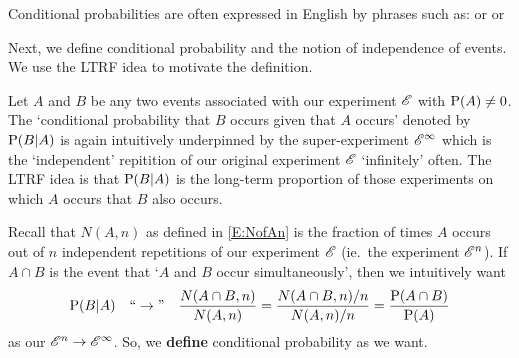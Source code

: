 Conditional probabilities are  often
expressed in English by phrases such as: or  or 

Next, we define conditional probability and the notion of independence of events.  We use the LTRF idea to motivate the definition.
\begin{idea}
Let $A$ and $B$ be any two events associated with our experiment $\EE{E}$ with $\P(A) \neq 0$.  The `conditional probability that $B$ occurs given that $A$ occurs' denoted by $\P(B|A)$ is again intuitively underpinned by the super-experiment $\EE{E}^{\infty}$ which is the `independent' repitition of our original experiment $\EE{E}$ `infinitely' often.  The LTRF idea is that $\P(B|A)$ is the long-term proportion of those experiments on which $A$ occurs that $B$ also occurs.
 
Recall that $N(A,n)$ as defined in \eqref{E:NofAn} is the fraction of times $A$ occurs out of $n$ independent repetitions of our experiment $\EE{E}$ (ie.~the experiment $\EE{E}^{n}$).  If $A \cap B$ is the event that `$A$ and $B$ occur simultaneously', then we intuitively want
\[
\P(B|A) \quad \lq\lq \rightarrow " \quad \frac{N(A \cap B,n)}{N(A,n)} = \frac{N(A \cap B,n)/n}{N(A,n)/n} =  \frac{\P(A \cap B)}{\P(A)}
\]
as our $\EE{E}^{n} \rightarrow \EE{E}^{\infty}$.  So, we {\bf define} conditional probability as we want.
 \end{idea}
